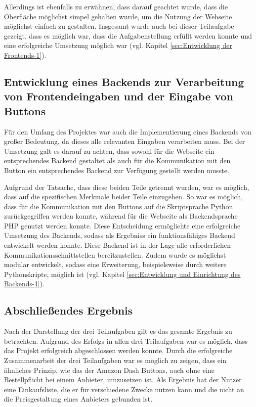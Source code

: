 Allerdings ist ebenfalls zu erwähnen, dass darauf geachtet wurde, dass die Oberfläche möglichst simpel gehalten wurde, um die Nutzung der Webseite möglichst einfach zu gestalten. 
Insgesamt wurde auch bei dieser Teilaufgabe gezeigt, dass es möglich war, dass die Aufgabenstellung erfüllt werden konnte und eine erfolgreiche Umsetzung möglich war (vgl. Kapitel \ref{sec:Entwicklung der Frontends-1}).

\subsection{Entwicklung eines Backends zur Verarbeitung von Frontendeingaben und der Eingabe von Buttons}
\label{sec:ErgebnisBackend}
Für den Umfang des Projektes war auch die Implementierung eines Backends von großer Bedeutung, da dieses alle relevanten Eingaben verarbeiten muss. Bei der Umsetzung galt es darauf zu achten, dass sowohl für die Webseite ein entsprechendes Backend gestaltet als auch für die Kommunikation mit den Button ein entsprechendes Backend zur Verfügung gestellt werden musste. 

Aufgrund der Tatsache, dass diese beiden Teile getrennt wurden, war es möglich, dass auf die spezifischen Merkmale beider Teile einzugehen. So war es möglich, dass für die Kommunikation mit den Buttons auf die Skriptsprache Python zurückgegriffen werden konnte, während für die Webseite als Backendsprache \ac{PHP} genutzt werden konnte. Diese Entscheidung ermöglichte eine erfolgreiche Umsetzung des Backends, sodass als Ergebniss ein funktionsfähiges Backend entwickelt werden konnte. Diese Backend ist in der Lage alle erforderlichen Kommunikationsschnittstellen bereitzustellen. Zudem wurde es möglichst modular entwickelt, sodass eine Erweiterung, beispielsweise durch weitere Pythonskripte, möglich ist (vgl. Kapitel \ref{sec:Entwicklung und Einrichtung des Backends-1}). 

\subsection{Abschließendes Ergebnis}
\label{sec:ErgebnisAbschluss}
Nach der Darstellung der drei Teilaufgaben gilt es das gesamte Ergebnis zu betrachten. Aufgrund des Erfolgs in allen drei Teilaufgaben war es möglich, dass das Projekt erfolgreich abgeschlossen werden konnte. Durch die erfolgreiche Zusammenarbeit der drei Teilaufgaben war es möglich zu zeigen, dass ein ähnliches Prinzip, wie das der Amazon Dash Buttons, auch ohne eine Bestellpflicht bei einem Anbieter, umzusetzen ist. Als Ergebnis hat der Nutzer eine Einkaufsliste, die er für verschiedene Zwecke nutzen kann und die nicht an die Preisgestaltung eines Anbieters gebunden ist. 

